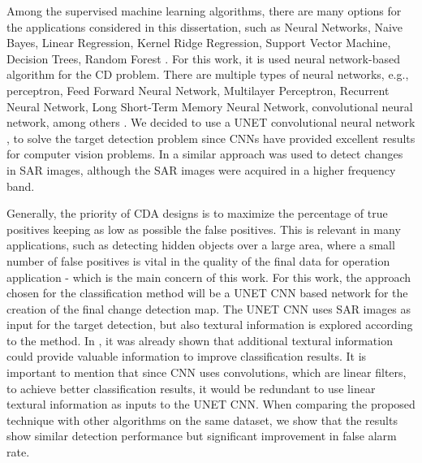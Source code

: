 Among the supervised machine learning algorithms, there are many options for the applications considered in this dissertation, such as Neural Networks, Naive Bayes, Linear Regression, Kernel Ridge Regression, Support Vector Machine, Decision Trees, Random Forest \cite{PefMe}.
For this work, it is used neural network-based algorithm for the CD problem. There are multiple types of neural networks, e.g., perceptron, Feed Forward Neural Network, Multilayer Perceptron, Recurrent Neural Network, Long Short-Term Memory Neural Network, convolutional neural network, among others \cite{PefMe}. We decided to use a UNET convolutional neural network \cite{Unet}, to solve the target detection problem since CNNs have provided excellent results for computer vision problems. In \cite{Kevin} a similar approach was used to detect changes in SAR images, although the SAR images were acquired in a higher frequency band.

Generally, the priority of CDA designs is to maximize the percentage of true positives keeping as low as possible the false positives. This is relevant in many applications, such as detecting hidden objects over a large area, where a small number of false positives is vital in the quality of the final data for operation application - which is the main concern of this work. For this work, the approach chosen for the classification method will be a UNET CNN based network for the creation of the final change detection map. The UNET CNN uses SAR images as input for the target detection, but also textural information is explored according to the method. In \cite{Rodrigo}, it was already shown that additional textural information could provide valuable information to improve classification results. It is important to mention that since CNN uses convolutions, which are linear filters, to achieve better classification results, it would be redundant to use linear textural information as inputs to the UNET CNN. When comparing the proposed technique with other algorithms on the same dataset, we show that the results show similar detection performance but significant improvement in false alarm rate.